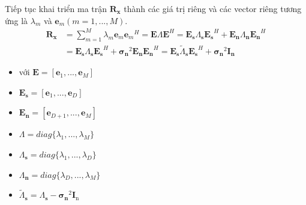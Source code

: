 Tiếp tục khai triển ma trận $\mathbf{R}_{\mathbf{x}}$ thành các giá trị riêng và các vector riêng tương ứng là $\lambda_{m}$ và $\mathbf{e}_{m} (m =1, ..., M)$.
\begin{equation}
\begin{split}
	\mathbf{R}_{\mathbf{x}} &= \sum_{m = 1}^{M} \lambda_{m}\mathbf{e}_{m}{\mathbf{e}_{m}}^{H} = \mathbf{E}\Lambda\mathbf{E}^{H} = \mathbf{E}_{\mathbf{s}}\Lambda_{\mathbf{s}}{\mathbf{E}_{\mathbf{s}}}^{H} + \mathbf{E}_{\mathbf{n}}\Lambda_{\mathbf{n}}{\mathbf{E}_{\mathbf{n}}}^{H} \\
	  &=\mathbf{E}_{\mathbf{s}}\Lambda_{\mathbf{s}}{\mathbf{E}_{\mathbf{s}}}^{H} +  {\mathbf{\sigma}_{\mathbf{n}}}^{2}\mathbf{E}_{\mathbf{n}}{\mathbf{E}_{\mathbf{n}}}^{H} = \mathbf{E}_{\mathbf{s}}\tilde{\Lambda}_{\mathbf{s}}{\mathbf{E}_{\mathbf{s}}}^{H} + {\mathbf{\sigma}_{\mathbf{n}}}^{2}\mathbf{I}_{\mathbf{n}}
\end{split}
\end{equation}
{\renewcommand\labelitemi{}
\begin{itemize}
  \item với $\mathbf{E} = [\mathbf{e}_{1}, ..., \mathbf{e}_{M}]$
  \item \hspace{0.7cm}$\mathbf{E}_{\mathbf{s}} = [\mathbf{e}_{1}, ..., \mathbf{e}_{D}]$
  \item \hspace{0.7cm}$\mathbf{E}_{\mathbf{n}} = [\mathbf{e}_{D+1}, ..., \mathbf{e}_{M}]$ 
  \item \hspace{0.7cm}$\Lambda = diag\{\lambda_{1}, ..., \lambda_{M}\}$
  \item \hspace{0.7cm}$\Lambda_{\mathbf{s}} = diag\{\lambda_{1}, ..., \lambda_{D}\}$
  \item \hspace{0.7cm}$\Lambda_{\mathbf{n}} = diag\{\lambda_{D}, ..., \lambda_{M}\}$
  \item \hspace{0.7cm}$\tilde{\Lambda}_{\mathbf{s}} = \Lambda_{\mathbf{s}} - {\mathbf{\sigma}_{\mathbf{n}}}^{2}\mathbf{I}_{\mathrm{n}}$
\end{itemize}
}

